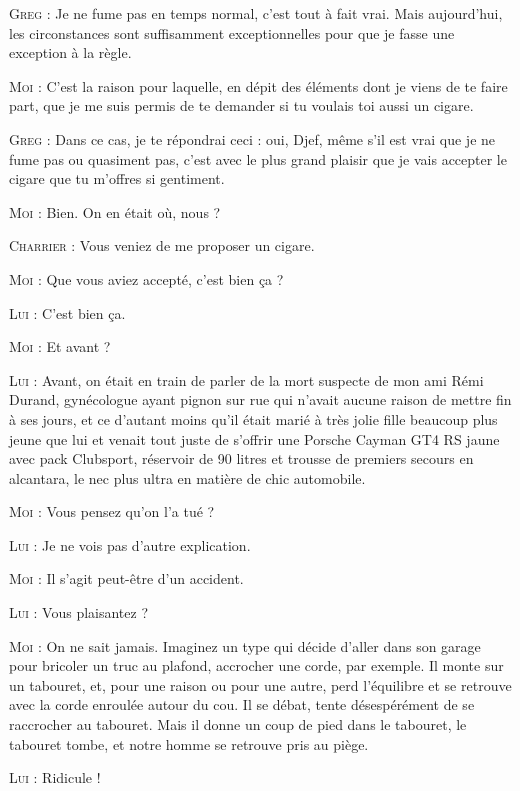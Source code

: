 \begin{dialogue}
\textsc{Greg} : Je ne fume pas en temps normal, c’est tout à fait vrai. Mais aujourd’hui, les circonstances sont suffisamment exceptionnelles pour que je fasse une exception à la règle.

\textsc{Moi} : C’est la raison pour laquelle, en dépit des éléments dont je viens de te faire part, que je me suis permis de te demander si tu voulais toi aussi un cigare.

\textsc{Greg} : Dans ce cas, je te répondrai ceci : oui, Djef, même s’il est vrai que je ne fume pas ou quasiment pas, c’est avec le plus grand plaisir que je vais accepter le cigare que tu m’offres si gentiment.

\textsc{Moi} : Bien. On en était où, nous ?

\textsc{Charrier} : Vous veniez de me proposer un cigare.

\textsc{Moi} : Que vous aviez accepté, c’est bien ça ?

\textsc{Lui} : C’est bien ça.

\textsc{Moi} : Et avant ?

\textsc{Lui} : Avant, on était en train de parler de la mort suspecte de mon ami Rémi Durand, gynécologue ayant pignon sur rue qui n’avait aucune raison de mettre fin à ses jours, et ce d’autant moins qu’il était marié à très jolie fille beaucoup plus jeune que lui et venait tout juste de s’offrir une Porsche Cayman GT4 RS jaune avec pack Clubsport, réservoir de 90 litres et trousse de premiers secours en alcantara, le nec plus ultra en matière de chic automobile.

\textsc{Moi} : Vous pensez qu’on l’a tué ?

\textsc{Lui} : Je ne vois pas d’autre explication.

\textsc{Moi} : Il s’agit peut-être d’un accident.

\textsc{Lui} : Vous plaisantez ?

\textsc{Moi} : On ne sait jamais. Imaginez un type qui décide d’aller dans son garage pour bricoler un truc au plafond, accrocher une corde, par exemple. Il monte sur un tabouret, et, pour une raison ou pour une autre, perd l’équilibre et se retrouve avec la corde enroulée autour du cou. Il se débat, tente désespérément de se raccrocher au tabouret. Mais il donne un coup de pied dans le tabouret, le tabouret tombe, et notre homme se retrouve pris au piège.

\textsc{Lui} : Ridicule !


\end{dialogue}
